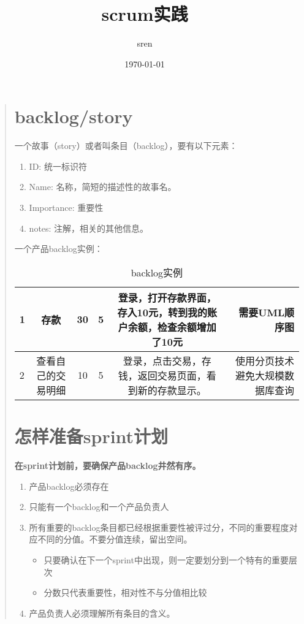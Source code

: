 \documentclass[a4paper,12pt]{article}
\title{scrum实践}
\author{sren}
\date{\today}
\begin{document}
\maketitle

\tableofcontents

\begin{quote}
 \section{backlog/story}

 一个故事（story）或者叫条目（backlog），要有以下元素：
 
 \begin{enumerate}
  \item ID: 统一标识符
  \item Name: 名称，简短的描述性的故事名。
  \item Importance: 重要性
  \item notes: 注解，相关的其他信息。
 \end{enumerate}

一个产品backlog实例：
\begin{table}
\begin{tabular}{|l|c|c|c|c|r|}
\hline
1	&存款	&30	&5	&登录，打开存款界面，存入10元，转到我的账户余额，检查余额增加了10元	&需要UML顺序图	\\
\hline
2	&查看自己的交易明细 &10 &5 &登录，点击交易，存钱，返回交易页面，看到新的存款显示。 &使用分页技术避免大规模数据库查询 \\
\hline
\end{tabular}
\caption{backlog实例}
\label{图表1}
\end{table}


\section{怎样准备sprint计划}
\textbf{在sprint计划前，要确保产品backlog井然有序。}

\begin{enumerate}
  \item 产品backlog必须存在
  \item 只能有一个backlog和一个产品负责人
  \item 所有重要的backlog条目都已经根据重要性被评过分，不同的重要程度对应不同的分值。不要分值连续，留出空间。
    \begin{itemize}
     \item 只要确认在下一个sprint中出现，则一定要划分到一个特有的重要层次
     \item 分数只代表重要性，相对性不与分值相比较
    \end{itemize}
  \item 产品负责人必须理解所有条目的含义。
 \end{enumerate}


\end{quote}
\end{document}
